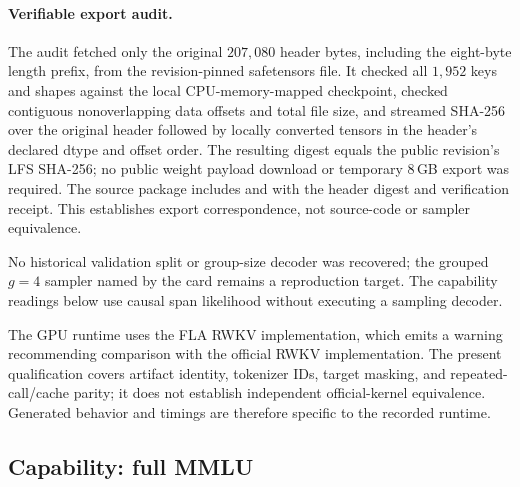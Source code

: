 \paragraph{Verifiable export audit.}
The audit fetched only the original $207{,}080$ header bytes, including the eight-byte
length prefix, from the revision-pinned safetensors file. It checked all $1{,}952$
keys and shapes against the local CPU-memory-mapped checkpoint, checked contiguous
nonoverlapping data offsets and total file size, and streamed SHA-256 over the original
header followed by locally converted tensors in the header's declared dtype and offset
order. The resulting digest equals the public revision's LFS SHA-256; no public weight
payload download or temporary 8\,GB export was required. The source package includes
 and
 with the header digest and verification receipt.
This establishes export correspondence, not source-code or sampler equivalence.

No historical validation split or group-size decoder was recovered; the grouped
$g{=}4$ sampler named by the card remains a reproduction target. The capability
readings below use causal span likelihood without executing a sampling decoder.

The GPU runtime uses the FLA RWKV implementation, which emits a warning recommending comparison with the official RWKV implementation. The present qualification covers artifact identity, tokenizer IDs, target masking, and repeated-call/cache parity; it does not establish independent official-kernel equivalence. Generated behavior and timings are therefore specific to the recorded runtime.

\subsection{Capability: full MMLU}
\label{m:mmlu}

